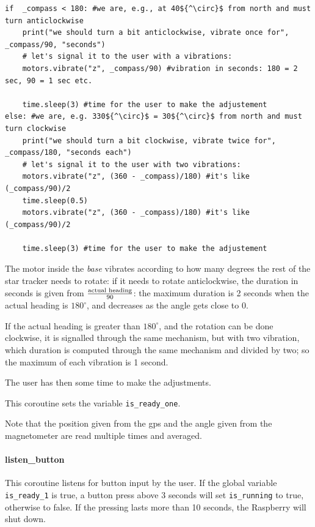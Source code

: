 \documentclass[]{article}
\begin{document}
\begin{lstlisting}[mathescape, language=PythonPlus, label={lst:waitgps}, caption=Extract from the \texttt{listen\_gps\_compass} coroutine: it makes the base motor vibrate according to the actual heading.]
if  _compass < 180: #we are, e.g., at 40${^\circ}$ from north and must turn anticlockwise
	print("we should turn a bit anticlockwise, vibrate once for", _compass/90, "seconds")
	# let's signal it to the user with a vibrations:
	motors.vibrate("z", _compass/90) #vibration in seconds: 180 = 2 sec, 90 = 1 sec etc.
	
	time.sleep(3) #time for the user to make the adjustement
else: #we are, e.g. 330${^\circ}$ = 30${^\circ}$ from north and must turn clockwise
	print("we should turn a bit clockwise, vibrate twice for", _compass/180, "seconds each")
	# let's signal it to the user with two vibrations:
	motors.vibrate("z", (360 - _compass)/180) #it's like (_compass/90)/2
	time.sleep(0.5)
	motors.vibrate("z", (360 - _compass)/180) #it's like (_compass/90)/2
	
	time.sleep(3) #time for the user to make the adjustement
\end{lstlisting}

The motor inside the \textit{base} vibrates according to how many degrees the rest of the star tracker needs to rotate: if it needs to rotate anticlockwise, the duration in seconds is given from $\frac{\textnormal{actual heading}}{90}$: the maximum duration is 2 seconds when the actual heading is $180^\circ$, and decreases as the angle gets close to 0. 

If the actual heading is greater than $180^\circ$, and the rotation can be done clockwise, it is signalled through the same mechanism, but with two vibration, which duration is computed through the same mechanism and divided by two; so the maximum of each vibration is 1 second. 

The user has then some time to make the adjustments.

This coroutine sets the variable \texttt{is\_ready\_one}. 

Note that the position given from the gps and the angle given from the magnetometer are read multiple times and averaged.

\paragraph{listen\_button} This coroutine listens for button input by the user. If the global variable \texttt{is\_ready\_1} is true, a button press above 3 seconds will set \texttt{is\_running} to true, otherwise to false. If the pressing lasts more than 10 seconds, the Raspberry will shut down.
\end{document}
